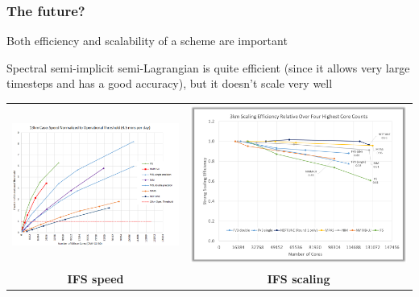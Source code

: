 \documentclass[aspectratio=43,9pt]{beamer}
\begin{document}
\begin{frame}
	\frametitle{The future?}
	\begin{myitemize}{3ex}
		\item Both efficiency and scalability of a scheme are important
		\item Spectral semi-implicit semi-Lagrangian is quite efficient (since it allows very large timesteps and has a good accuracy), but it doesn't scale very well
	\end{myitemize}
	\begin{center}
		\begin{tabular}{cc}
			\includegraphics[width=.45\textwidth]{IFS_speed}	& \includegraphics[width=.45\textwidth]{IFS_scaling}	\\
			\textbf{IFS speed}	&	\textbf{IFS scaling}
		\end{tabular}
	\end{center}
\end{frame}
%
%
\end{document}
